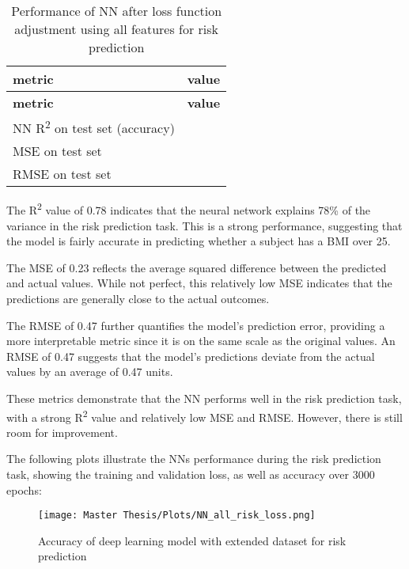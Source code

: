 \begin{table}[H]
\begin{longtable}{|>{\raggedright}p{4cm}|>{\raggedright\arraybackslash}p{10cm}|}
\hline
\textbf{metric} & \textbf{value} \\
\hline
\endfirsthead
\hline
\textbf{metric} & \textbf{value} \\
\hline
\endhead
\hline
\endfoot
NN R\textsuperscript{2} on test set (accuracy) & 0.78 \\
\hline
MSE on test set & 0.23 \\
\hline
RMSE on test set & 0.47 \\
\hline
\end{longtable}
\caption{Performance of NN after loss function adjustment using all features for risk prediction}
\label{tab:PCAdiffallfeaturesrisk}
\end{table}

The R\textsuperscript{2} value of 0.78 indicates that the neural network explains 78\% of the variance in the risk prediction task. This is a strong performance, suggesting that the model is fairly accurate in predicting whether a subject has a BMI over 25.

The MSE of 0.23 reflects the average squared difference between the predicted and actual values. While not perfect, this relatively low MSE indicates that the predictions are generally close to the actual outcomes.

The RMSE of 0.47 further quantifies the model's prediction error, providing a more interpretable metric since it is on the same scale as the original values. An RMSE of 0.47 suggests that the model's predictions deviate from the actual values by an average of 0.47 units.

These metrics demonstrate that the NN performs well in the risk prediction task, with a strong R\textsuperscript{2} value and relatively low MSE and RMSE. However, there is still room for improvement.

The following plots illustrate the NNs performance during the risk prediction task, showing the training and validation loss, as well as accuracy over 3000 epochs:

\FloatBarrier
\begin{figure}[h!]
\centering
    \texttt{[image: Master Thesis/Plots/NN\_all\_risk\_loss.png]}
    \caption{Accuracy of deep learning model with extended dataset for risk prediction}
\label{figure:modellossNNalldatriskacc}
\end{figure}
\FloatBarrier

